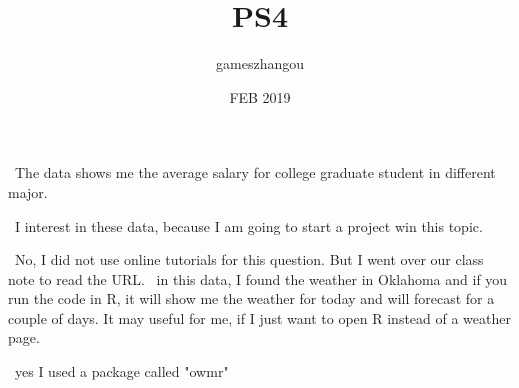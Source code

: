 \documentclass{article}
\title{PS4}
\author{gameszhangou }
\date{ FEB 2019 }
\begin{document}
\
The data shows me the average salary for college graduate student in different major.


\
I interest in these data, because I am going to start a project win this topic.

\
No, I did not use online tutorials for this question. But I went over our class note to read the URL.
\
in this data, I found the weather in Oklahoma and if you run the code in R, it will show me the weather for today and will forecast for a couple of days. It may useful for me, if I just want to open R instead of a weather page. 

\
yes I used a package called "owmr"
\end{document}
